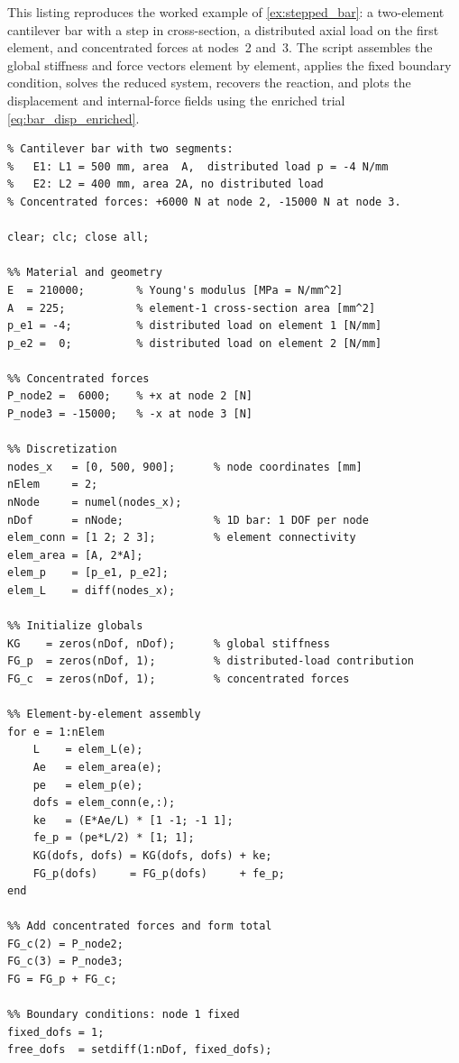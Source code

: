 This listing reproduces the worked example of \cref{ex:stepped_bar}: a
two-element cantilever bar with a step in cross-section, a distributed axial
load on the first element, and concentrated forces at nodes~2 and~3.
The script assembles the global stiffness and force vectors element by
element, applies the fixed boundary condition, solves the reduced system,
recovers the reaction, and plots the displacement and internal-force fields
using the enriched trial \cref{eq:bar_disp_enriched}.

\begin{lstlisting}[caption={Stepped bar with distributed and concentrated loads (Chapter~\ref{ch:1d})},
                   label={code:stepped_bar}]
% stepped_bar_2elem.m -- two-element stepped bar (Chapter 3)
% Cantilever bar with two segments:
%   E1: L1 = 500 mm, area  A,  distributed load p = -4 N/mm
%   E2: L2 = 400 mm, area 2A, no distributed load
% Concentrated forces: +6000 N at node 2, -15000 N at node 3.

clear; clc; close all;

%% Material and geometry
E  = 210000;        % Young's modulus [MPa = N/mm^2]
A  = 225;           % element-1 cross-section area [mm^2]
p_e1 = -4;          % distributed load on element 1 [N/mm]
p_e2 =  0;          % distributed load on element 2 [N/mm]

%% Concentrated forces
P_node2 =  6000;    % +x at node 2 [N]
P_node3 = -15000;   % -x at node 3 [N]

%% Discretization
nodes_x   = [0, 500, 900];      % node coordinates [mm]
nElem     = 2;
nNode     = numel(nodes_x);
nDof      = nNode;              % 1D bar: 1 DOF per node
elem_conn = [1 2; 2 3];         % element connectivity
elem_area = [A, 2*A];
elem_p    = [p_e1, p_e2];
elem_L    = diff(nodes_x);

%% Initialize globals
KG    = zeros(nDof, nDof);      % global stiffness
FG_p  = zeros(nDof, 1);         % distributed-load contribution
FG_c  = zeros(nDof, 1);         % concentrated forces

%% Element-by-element assembly
for e = 1:nElem
    L    = elem_L(e);
    Ae   = elem_area(e);
    pe   = elem_p(e);
    dofs = elem_conn(e,:);
    ke   = (E*Ae/L) * [1 -1; -1 1];
    fe_p = (pe*L/2) * [1; 1];
    KG(dofs, dofs) = KG(dofs, dofs) + ke;
    FG_p(dofs)     = FG_p(dofs)     + fe_p;
end

%% Add concentrated forces and form total
FG_c(2) = P_node2;
FG_c(3) = P_node3;
FG = FG_p + FG_c;

%% Boundary conditions: node 1 fixed
fixed_dofs = 1;
free_dofs  = setdiff(1:nDof, fixed_dofs);


\end{lstlisting}
